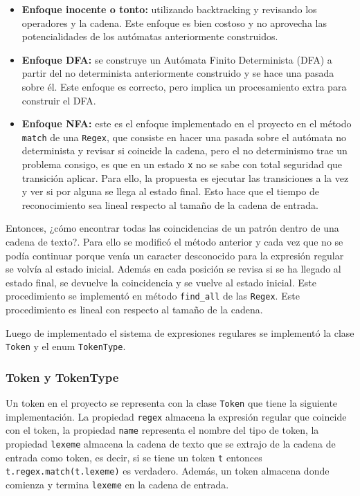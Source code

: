 \begin{itemize}
        \item \textbf{Enfoque inocente o tonto:} utilizando backtracking y revisando los operadores y la cadena. Este enfoque es bien costoso y no aprovecha las potencialidades de los autómatas anteriormente construidos.
        \item \textbf{Enfoque DFA:} se construye un Autómata Finito Determinista (DFA) a partir del no determinista anteriormente construido y se hace una pasada sobre él. Este enfoque es correcto, pero implica un procesamiento extra para construir el DFA.
        \item \textbf{Enfoque NFA:} este es el enfoque implementado en el proyecto en el método \verb|match| de una \verb|Regex|, que consiste en hacer una pasada sobre el autómata no determinista y revisar si coincide la cadena, pero el no determinismo trae un problema consigo, es que en un estado \verb|x| no se sabe con total seguridad que transición aplicar. Para ello, la propuesta es ejecutar las transiciones a la vez y ver si por alguna se llega al estado final. Esto hace que el tiempo de reconocimiento sea lineal respecto al tamaño de la cadena de entrada.
\end{itemize}

Entonces, ¿cómo encontrar todas las coincidencias de un patrón dentro de una cadena de texto?. Para ello se modificó el método anterior y cada vez que no se podía continuar  porque venía un caracter desconocido para la expresión regular se volvía al estado inicial. Además en cada posición se revisa si se ha llegado al estado final, se devuelve la coincidencia y se vuelve al estado inicial. Este procedimiento se implementó en método \verb|find_all| de las \verb|Regex|. Este procedimiento es lineal con respecto al tamaño de la cadena.

Luego de implementado el sistema de expresiones regulares se implementó la clase \verb|Token| y el enum \verb|TokenType|.

\subsubsection{Token y TokenType}

Un token en el proyecto se representa con la clase \verb|Token| que tiene la siguiente implementación. La propiedad \verb|regex| almacena la expresión regular que coincide con el token, la propiedad \verb|name| representa el nombre del tipo de token, la propiedad \verb|lexeme| almacena la cadena de texto que se extrajo de la cadena de entrada como token, es decir, si se tiene un token \verb|t| entonces \verb|t.regex.match(t.lexeme)| es verdadero. Además, un token almacena donde comienza y termina \verb|lexeme| en la cadena de entrada.

